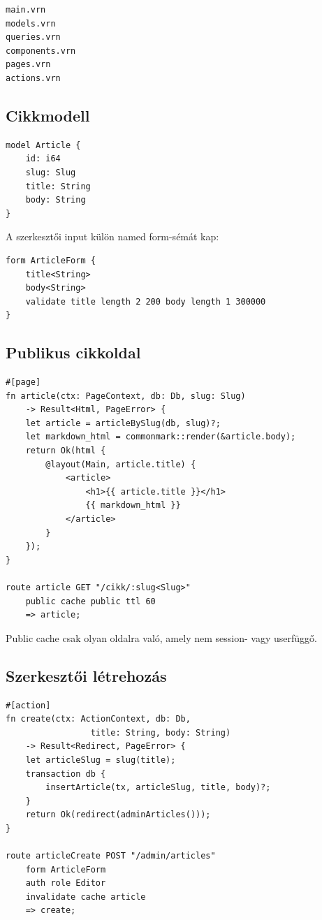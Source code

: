 \begin{lstlisting}
main.vrn
models.vrn
queries.vrn
components.vrn
pages.vrn
actions.vrn
\end{lstlisting}

\subsection*{Cikkmodell}

\begin{lstlisting}[language=Velran]
model Article {
    id: i64
    slug: Slug
    title: String
    body: String
}
\end{lstlisting}

A szerkesztői input külön named form-sémát kap:

\begin{lstlisting}[language=Velran]
form ArticleForm {
    title<String>
    body<String>
    validate title length 2 200 body length 1 300000
}
\end{lstlisting}

\subsection*{Publikus cikkoldal}

\begin{lstlisting}[language=Velran]
#[page]
fn article(ctx: PageContext, db: Db, slug: Slug)
    -> Result<Html, PageError> {
    let article = articleBySlug(db, slug)?;
    let markdown_html = commonmark::render(&article.body);
    return Ok(html {
        @layout(Main, article.title) {
            <article>
                <h1>{{ article.title }}</h1>
                {{ markdown_html }}
            </article>
        }
    });
}

route article GET "/cikk/:slug<Slug>"
    public cache public ttl 60
    => article;
\end{lstlisting}

Public cache csak olyan oldalra való, amely nem session- vagy userfüggő.

\subsection*{Szerkesztői létrehozás}

\begin{lstlisting}[language=Velran]
#[action]
fn create(ctx: ActionContext, db: Db,
                 title: String, body: String)
    -> Result<Redirect, PageError> {
    let articleSlug = slug(title);
    transaction db {
        insertArticle(tx, articleSlug, title, body)?;
    }
    return Ok(redirect(adminArticles()));
}

route articleCreate POST "/admin/articles"
    form ArticleForm
    auth role Editor
    invalidate cache article
    => create;
\end{lstlisting}

